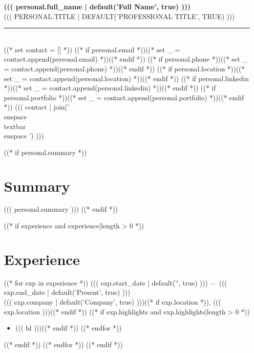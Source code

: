 \documentclass[11pt,a4paper]{article}
\begin{document}
\begin{center}
  {\fontsize{28}{32}\selectfont\bfseries\color{primary} ((( personal.full_name | default('Full Name', true) )))}\\[8pt]
  {\fontsize{10}{12}\selectfont\color{muted}\MakeUppercase{((( personal.title | default('Professional Title', true) )))}}\\[10pt]
  {\color{light}\rule{0.4\textwidth}{0.3pt}}\\[8pt]
  {\fontsize{8}{10}\selectfont\color{muted}
    ((* set contact = [] *))
    ((* if personal.email *))((* set _ = contact.append(personal.email) *))((* endif *))
    ((* if personal.phone *))((* set _ = contact.append(personal.phone) *))((* endif *))
    ((* if personal.location *))((* set _ = contact.append(personal.location) *))((* endif *))
    ((* if personal.linkedin *))((* set _ = contact.append(personal.linkedin) *))((* endif *))
    ((* if personal.portfolio *))((* set _ = contact.append(personal.portfolio) *))((* endif *))
    ((( contact | join(' \\enspace\\textbar\\enspace ') )))
  }
\end{center}

\vspace{8pt}

((* if personal.summary *))
\section{Summary}
{\small ((( personal.summary )))}
((* endif *))

((* if experience and experience|length > 0 *))
\section{Experience}
((* for exp in experience *))
 \hfill {\small\color{muted} ((( exp.start_date | default('', true) ))) --- ((( exp.end_date | default('Present', true) )))}\\
{\small\color{muted} ((( exp.company | default('Company', true) )))((* if exp.location *)), ((( exp.location )))((* endif *))}
((* if exp.highlights and exp.highlights|length > 0 *))
\begin{itemize}[leftmargin=14pt, itemsep=1pt, parsep=0pt, topsep=4pt]
((* for hl in exp.highlights *))((* if hl *))\item {\small ((( hl )))}((* endif *))
((* endfor *))
\end{itemize}
((* endif *))
\vspace{8pt}
((* endfor *))
((* endif *))
\end{document}
